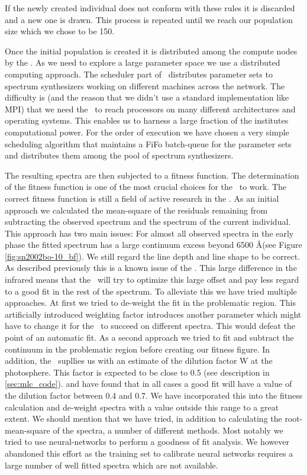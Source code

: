 If the newly created individual does not conform with these rules it is discarded and a new one is drawn. This process is repeated until we reach our population size which we chose to be 150.

Once the initial population is created it is distributed among the compute nodes by the \dalek. As we need to explore a large parameter space we use a distributed computing approach. The scheduler part of \dalek\ distributes parameter sets to spectrum synthesizers working on different machines across the network. The difficulty is (and the reason that we didn't use a standard implementation like MPI) that we need the \dalek\ to reach processors on many different architectures and operating systems. This enables us to harness a large fraction of the institutes computational power. For the order of execution we have chosen a very simple scheduling algorithm that maintains a FiFo batch-queue for the parameter sets and distributes them among the pool of spectrum synthesizers.

The resulting spectra are then subjected to a fitness function. The determination of the fitness function is one of the most crucial  choices for the \ga\ to work. The correct fitness function is still a field of active research in the \dalek. As an initial approach we calculated the mean-square of the residuals remaining from subtracting the observed spectrum and the spectrum of the current individual. This approach has two main issues: For almost all observed spectra in the early phase the fitted spectrum has a large continuum excess beyond 6500 \AA (see Figure \ref{fig:sn2002bo-10_bf}). We still regard the line depth and line shape to be correct. As described previously this is a known issue of the \mlc. This large difference in the infrared means that the \dalek\ will try to optimize this large offset and pay less regard to a good fit in the rest of the spectrum. To alleviate this we have tried multiple approaches. At first we tried to de-weight the fit in the problematic region. This artificially introduced weighting factor introduces another parameter which might have to change it for the \ga\ to succeed on different spectra. This would defeat the point of an automatic fit. As a second approach we tried to fit and subtract the continuum in the problematic region before creating our fitness figure. 
In addition, the \mlc\ supllies us with an estimate of the dilution factor W at the photosphere. This factor is expected to be close to 0.5 (see description in \ref{sec:mlc_code}). \citet{hachinger_dipl2007} and \citet{hachinger_phd2011} have found that in all cases a good fit will have a value of the dilution factor between 0.4 and 0.7. We have incorporated this into the fitness calculation and de-weight spectra with a value outside this range to a great extent.
We should mention that we have tried, in addition to calculating the root-mean-square of the spectra, a number of different methods. Most notably we tried to use neural-networks to perform a goodness of fit analysis. We however abandoned this effort as the training set to calibrate neural networks requires a large number of well fitted spectra which are not available. 

